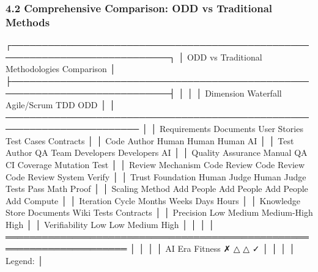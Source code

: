 \documentclass[
]{article}
\newenvironment{Shaded}{}{}
\newcommand{\NormalTok}[1]{#1}
\begin{document}
\hypertarget{42-comprehensive-comparison-odd-vs-traditional-methods}{%
\subsubsection{4.2 Comprehensive Comparison: ODD vs Traditional
Methods}\label{42-comprehensive-comparison-odd-vs-traditional-methods}}

\begin{Shaded}
\begin{Highlighting}[]
\NormalTok{┌────────────────────────────────────────────────────────────────────────────┐}
\NormalTok{│               ODD vs Traditional Methodologies Comparison                   │}
\NormalTok{├────────────────────────────────────────────────────────────────────────────┤}
\NormalTok{│                                                                            │}
\NormalTok{│  Dimension        Waterfall    Agile/Scrum    TDD          ODD            │}
\NormalTok{│  ──────────────────────────────────────────────────────────────────────── │}
\NormalTok{│  Requirements     Documents    User Stories   Test Cases   Contracts      │}
\NormalTok{│  Code Author      Human        Human          Human        AI             │}
\NormalTok{│  Test Author      QA Team      Developers     Developers   AI             │}
\NormalTok{│  Quality Assurance Manual QA   CI             Coverage     Mutation Test  │}
\NormalTok{│  Review Mechanism Code Review  Code Review    Code Review  System Verify  │}
\NormalTok{│  Trust Foundation Human Judge  Human Judge    Tests Pass   Math Proof     │}
\NormalTok{│  Scaling Method   Add People   Add People     Add People   Add Compute    │}
\NormalTok{│  Iteration Cycle  Months       Weeks          Days         Hours          │}
\NormalTok{│  Knowledge Store  Documents    Wiki           Tests        Contracts      │}
\NormalTok{│  Precision        Low          Medium         Medium{-}High  High           │}
\NormalTok{│  Verifiability    Low          Low            Medium       High           │}
\NormalTok{│                                                                            │}
\NormalTok{│  ══════════════════════════════════════════════════════════════════════   │}
\NormalTok{│                                                                            │}
\NormalTok{│  AI Era Fitness   ✗            △              △            ✓              │}
\NormalTok{│                                                                            │}
\NormalTok{│  Legend:                                                                   │}

\end{Highlighting}
\end{Shaded}
\end{document}
